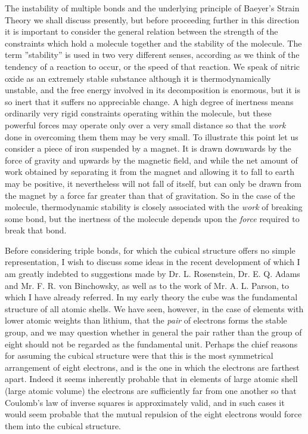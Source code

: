 \documentclass[11pt]{memoir}
\begin{document}
The instability of multiple bonds and the underlying principle of Baeyer's Strain Theory we shall discuss presently, but before proceeding further in this direction it is important to consider the general relation between the strength of the constraints which hold a molecule together and the stability of the molecule.  The term ''stability'' is used in two very different senses, according as we think of the tendency of a reaction to occur, or the speed of that reaction.  We speak of nitric oxide as an extremely stable substance although it is thermodynamically unstable, and the free energy involved in its decomposition is enormous, but it is so inert that it suffers no appreciable change.  A high degree of inertness means ordinarily very rigid constraints operating within the molecule, but these powerful forces may operate only over a very small distance so that the \emph{work} done in overcoming them them may be very small.  To illustrate this point let us consider a piece of iron suspended by a magnet.  It is drawn downwards by the force of gravity and upwards by the magnetic field, and while the net amount of work obtained by separating it from the magnet and allowing it to fall to earth may be positive, it nevertheless will not fall of itself, but can only be drawn from the magnet by a force far greater than that of gravitation.  So in the case of the molecule, thermodynamic stability is closely associated with the \emph{work} of breaking some bond, but the inertness of the molecule depends upon the \emph{force} required to break that bond.

Before considering triple bonds, for which the cubical structure offers no simple representation, I wish to discuss some ideas in the recent development of which I am greatly indebted to suggestions made by Dr. L. Rosenstein, Dr. E. Q. Adams and Mr. F. R. von Binchowsky, as well as to the work of Mr. A. L. Parson, to which I have already referred.  In my early theory the cube was the fundamental structure of all atomic shells.  We have seen, however, in the case of elements with lower atomic weights than lithium, that the \emph{pair} of electrons forms the stable group, and we may question whether in general the pair rather than the group of eight should not be regarded as the fundamental unit.  Perhaps the chief reasons for assuming the cubical structure were that this is the most symmetrical arrangement of eight electrons, and is the one in which the electrons are farthest apart.  Indeed it seems inherently probable that in elements of large atomic shell (large atomic volume) the electrons are sufficiently far from one another so that Coulomb's law of inverse squares is approximately valid, and in such cases it would seem probable that the mutual repulsion of the eight electrons would force them into the cubical structure.
\end{document}
